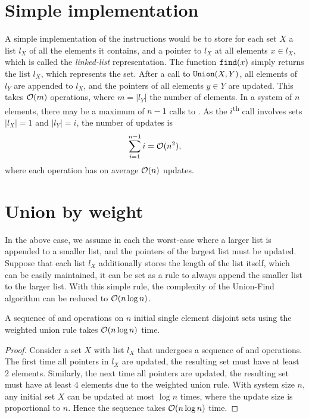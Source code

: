 \section{Simple implementation}
A simple implementation of the instructions would be to store for each set $X$ a list $l_X$ of all the elements it contains, and a pointer to $l_X$ at all elements $x\in l_X$, which is called the \emph{linked-list} representation. The function $\texttt{find}(x)$ simply returns the list $l_X$, which represents the set. After a call to $\texttt{Union}(X, Y)$, all elements of $l_Y$ are appended to $l_X$, and the pointers of all elements $y\in Y$ are updated. This takes $\mathcal{O}(m)$ operations, where $m=|l_Y|$ the number of elements. In a system of $n$ elements, there may be a maximum of $n-1$ calls to . As the $i$\textsuperscript{th} call involves sets $|l_X|=1$ and $|l_Y|=i$, the number of updates is 
\begin{equation}
  \sum_{i=1}^{n-1} i = \mathcal{O}(n^2),
\end{equation}
where each  operation has on average $\mathcal{O}(n)$ updates. 

\section{Union by weight}
In the above case, we assume in each  the worst-case where a larger list is appended to a smaller list, and the pointers of the largest list must be updated. Suppose that each list $l_X$ additionally stores the length of the list itself, which can be easily maintained, it can be set as a rule to always append the smaller list to the larger list. With this simple rule, the complexity of the Union-Find algorithm can be reduced to $\mathcal{O}(n \log n)$. 

\begin{theorem}
  A sequence of  and  operations on $n$ initial single element disjoint sets using the weighted union rule takes $\mathcal{O}(n \log n)$ time. 
\end{theorem}
\begin{proof}
  Consider a set $X$ with list $l_X$ that undergoes a sequence of  and  operations. The first time all pointers in $l_X$ are updated, the resulting set must have at least 2 elements. Similarly, the next time all pointers are updated, the resulting set must have at least 4 elements due to the weighted union rule. With system size $n$, any initial set $X$ can be updated at most $\log n$ times, where the update size is proportional to $n$. Hence the sequence takes $\mathcal{O}(n \log n)$ time. 
\end{proof}

